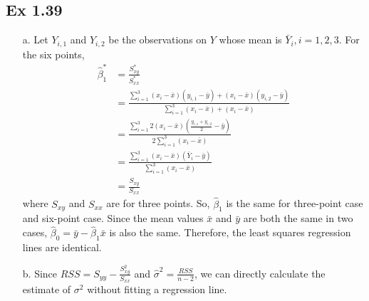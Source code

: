 \documentclass[10pt]{report}
\begin{document}
\subsection*{Ex 1.39}
\begin{enumerate}
	\item [a.]
	Let $Y_{i,1}$ and $Y_{i,2}$ be the observations on $Y$ whose mean is $\bar{Y}_i, i=1,2,3$. For the six points,
	\begin{align*}
		\hat{\beta}_1^* 
		&= \frac{S_{xy}^*}{S_{xx}^*}\\
		&= \frac{\sum_{i=1}^{3} (x_i - \bar{x})(y_{i,1}-\bar{y}) + (x_i - \bar{x})(y_{i,2}-\bar{y}) }{\sum_{i=1}^{3} (x_i - \bar{x}) + (x_i - \bar{x})}\\
		&= \frac{\sum_{i=1}^{3} 2(x_i - \bar{x})(\frac{y_{i,1} + y_{i,2}}{2}-\bar{y}) }{2\sum_{i=1}^{3}(x_i - \bar{x})}\\
		&= \frac{\sum_{i=1}^{3} (x_i - \bar{x})(\bar{Y}_i-\bar{y})}{\sum_{i=1}^{3}(x_i - \bar{x})}\\
		&= \frac{S_{xy}}{S_{xx}}
	\end{align*}
	where $S_{xy}$ and $S_{xx}$ are for three points. So, $\hat{\beta}_1$ is the same for three-point case and six-point case. Since the mean values $\bar{x}$ and $\bar{y}$ are both the same in two cases, $\hat{\beta}_0 = \bar{y} - \hat{\beta}_1 \bar{x}$ is also the same. Therefore, the least squares regression lines are identical.
	
	\item [b.]
	Since $RSS = S_{yy} - \frac{S_{xy}^2}{S_{xx}}$ and $\hat{\sigma}^2 = \frac{RSS}{n-2}$, we can directly calculate the estimate of $\sigma^2$ without fitting a regression line.
\end{enumerate}
\end{document}
